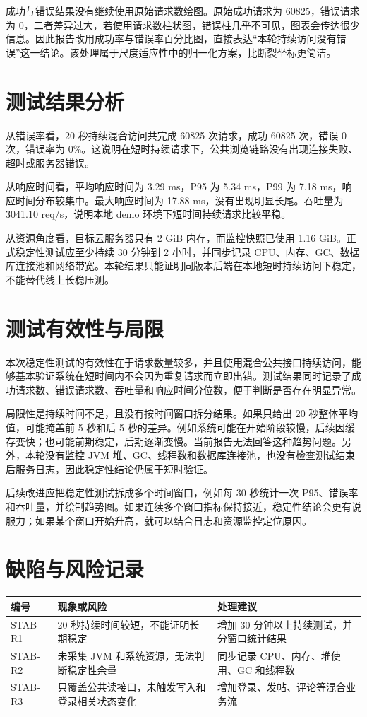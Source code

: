 \documentclass[UTF8,a4paper,12pt]{ctexart}
\begin{document}
成功与错误结果没有继续使用原始请求数绘图。原始成功请求为 60825，错误请求为 0，二者差异过大，若使用请求数柱状图，错误柱几乎不可见，图表会传达很少信息。因此报告改用成功率与错误率百分比图，直接表达“本轮持续访问没有错误”这一结论。该处理属于尺度适应性中的归一化方案，比断裂坐标更简洁。

\section{测试结果分析}
从错误率看，20 秒持续混合访问共完成 60825 次请求，成功 60825 次，错误 0 次，错误率为 0\%。这说明在短时持续请求下，公共浏览链路没有出现连接失败、超时或服务器错误。

从响应时间看，平均响应时间为 3.29 ms，P95 为 5.34 ms，P99 为 7.18 ms，响应时间分布较集中。最大响应时间为 17.88 ms，没有出现明显长尾。吞吐量为 3041.10 req/s，说明本地 demo 环境下短时间持续请求比较平稳。

从资源角度看，目标云服务器只有 2 GiB 内存，而监控快照已使用 1.16 GiB。正式稳定性测试应至少持续 30 分钟到 2 小时，并同步记录 CPU、内存、GC、数据库连接池和网络带宽。本轮结果只能证明同版本后端在本地短时持续访问下稳定，不能替代线上长稳压测。

\section{测试有效性与局限}
本次稳定性测试的有效性在于请求数量较多，并且使用混合公共接口持续访问，能够基本验证系统在短时间内不会因为重复请求而立即出错。测试结果同时记录了成功请求数、错误请求数、吞吐量和响应时间分位数，便于判断是否存在明显异常。

局限性是持续时间不足，且没有按时间窗口拆分结果。如果只给出 20 秒整体平均值，可能掩盖前 5 秒和后 5 秒的差异。例如系统可能在开始阶段较慢，后续因缓存变快；也可能前期稳定，后期逐渐变慢。当前报告无法回答这种趋势问题。另外，本轮没有监控 JVM 堆、GC、线程数和数据库连接池，也没有检查测试结束后服务日志，因此稳定性结论仍属于短时验证。

后续改进应把稳定性测试拆成多个时间窗口，例如每 30 秒统计一次 P95、错误率和吞吐量，并绘制趋势图。如果连续多个窗口指标保持接近，稳定性结论会更有说服力；如果某个窗口开始升高，就可以结合日志和资源监控定位原因。

\section{缺陷与风险记录}
\begin{longtable}{P{2.0cm}P{5.5cm}P{5.8cm}}
\toprule
编号 & 现象或风险 & 处理建议\\
\midrule
STAB-R1 & 20 秒持续时间较短，不能证明长期稳定 & 增加 30 分钟以上持续测试，并分窗口统计结果\\
STAB-R2 & 未采集 JVM 和系统资源，无法判断稳定性余量 & 同步记录 CPU、内存、堆使用、GC 和线程数\\
STAB-R3 & 只覆盖公共读接口，未触发写入和登录相关状态变化 & 增加登录、发帖、评论等混合业务流\\
\bottomrule
\end{longtable}
\end{document}
